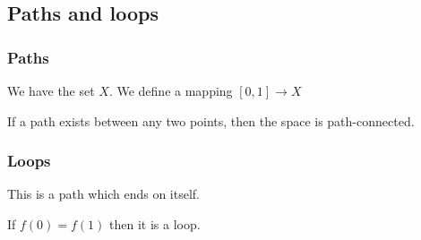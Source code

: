 
\subsection{Paths and loops}

\subsubsection{Paths}

We have the set \(X\). We define a mapping \([0,1]\rightarrow X\)

If a path exists between any two points, then the space is path-connected.

\subsubsection{Loops}

This is a path which ends on itself.

If \(f(0)=f(1)\) then it is a loop.

